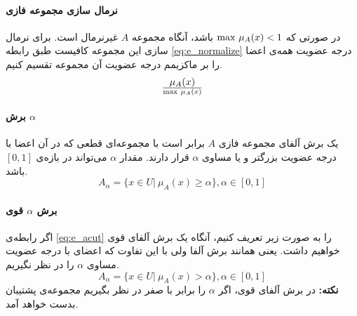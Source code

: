 \documentclass[12pt,a4paper]{article}
\theoremstyle{definition}
\begin{document}
\paragraph{نرمال سازی مجموعه فازی}
در صورتی که 
$ {\rm max}\ \mu_{A}(x) < 1$
باشد، آنگاه مجموعه $A$ غیرنرمال است. برای نرمال سازی این مجموعه کافیست طبق رابطه 
\ref{eq:e_normalize}
درجه عضویت همه‌ی اعضا را بر ماکزیمم درجه عضویت آن مجموعه تقسیم کنیم.
\begin{equation}\label{eq:e_normalize}
	\mu_{A}(x) \over {{\rm max}\ \mu_{A}(x)}
\end{equation}
\paragraph{برش $\alpha$}
یک برش آلفای 
مجموعه‌ فازی $A$ برابر است با مجموعه‌ای قطعی که در آن اعضا با درجه عضویت بزرگتر و یا مساوی $\alpha$ قرار دارند. مقدار $\alpha$ می‌تواند در بازه‌ی 
$[0,1]$
باشد. 
\begin{equation}\label{eq:e_acut}
	A_{\alpha}=\{ x \in U |\ \mu_{A}(x) \ge \alpha \}, \alpha \in [0,1]
\end{equation}
\paragraph{برش $\alpha$ قوی}
اگر رابطه‌ی 
\ref{eq:e_acut}
را به صورت زیر تعریف کنیم، آنگاه یک برش آلفای قوی خواهیم داشت. یعنی همانند برش آلفا ولی با این تفاوت که اعضای با درجه عضویت مساوی $\alpha$ را در نظر نگیریم.
\begin{equation}\label{eq:e_acuta}
A_{\alpha}=\{ x \in U |\ \mu_{A}(x) > \alpha \}, \alpha \in [0,1]
\end{equation}
\textbf{نکته:}
در برش آلفای قوی، اگر $\alpha$ را برابر با صفر در نظر بگیریم مجموعه‌ی پشتیبان بدست خواهد آمد.
\end{document}
